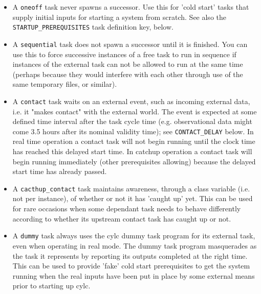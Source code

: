 \documentclass[11pt,a4paper]{article}
\begin{document}
\begin{itemize}
    \item A \lstinline=oneoff= task never spawns a successor. Use this for 
        'cold start' tasks that supply initial inputs for starting a
        system from scratch.  See also the
        \lstinline=STARTUP_PREREQUISITES=
        task definition key, below.

    \item A \lstinline=sequential= task does not spawn a successor until it is
        finished. You can use this to force successive instances of a
        free task to run in sequence if instances of the external task
        can not be allowed to run at the same time (perhaps because they
        would interfere with each other through use of the same
        temporary files, or similar).

    \item A \lstinline=contact= task waits on an external event, such as
        incoming external data, i.e. it "makes contact" with the
        external world.  The event is expected at some defined time
        interval after the task cycle time (e.g. observational data
        might come 3.5 hours after its nominal validity time); see
        \lstinline=CONTACT_DELAY= below. In real time operation a contact task will
        not begin running until the clock time has reached this delayed
        start time. In catchup operation a contact task will begin
        running immediately (other prerequisites allowing) because the
        delayed start time has already passed.  
        
    \item A \lstinline=cacthup_contact= task maintains awareness,
        through a class variable (i.e. not per instance), of whether or
        not it has 'caught up' yet.  This can be used for rare occasions
        when some dependant task needs to behave differently according
        to whether its upstream contact task has caught up or not.

    \item A \lstinline=dummy= task always uses the cylc dummy task
        program for its external task, even when operating in real mode.
        The dummy task program masquerades as the task it represents by
        reporting its outputs completed at the right time. This can be
        used to provide 'fake' cold start prerequisites to get the
        system running when the real inputs have been put in place by
        some external means prior to starting up cylc.

\end{itemize}
\end{document}
